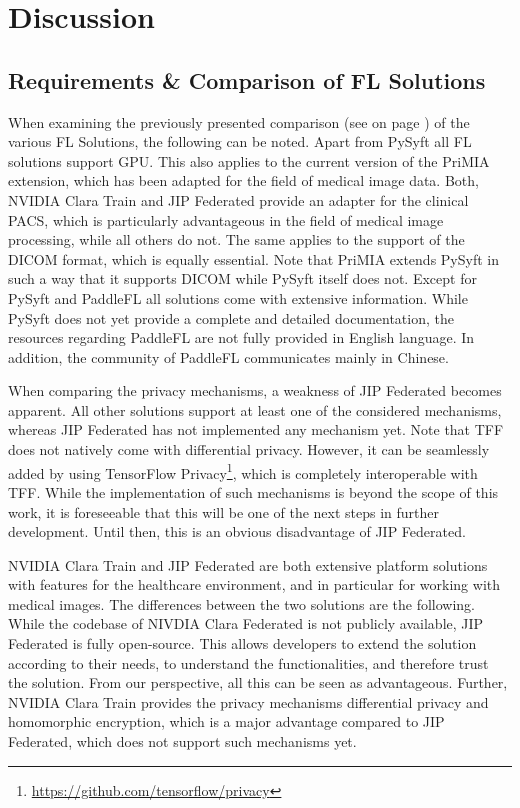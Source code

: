 \section{Discussion}
\label{sec:Discussion}

\subsection{Requirements \& Comparison of FL Solutions}
\label{subsec:DiscussionRequirements}

When examining the previously presented comparison (see  on page \pageref{subsec:ResultsRequirements}) of the various FL Solutions, the following can be noted.
Apart from PySyft all FL solutions support GPU. This also applies to the current version of the PriMIA extension, which has been adapted for the field of medical image data.
Both, NVIDIA Clara Train and JIP Federated provide an adapter for the clinical PACS, which is particularly advantageous in the field of medical image processing, while all others do not. The same applies to the support of the DICOM format, which is equally essential.
Note that PriMIA extends PySyft in such a way that it supports DICOM while PySyft itself does not.
Except for PySyft and PaddleFL all solutions come with extensive information. While PySyft does not yet provide a complete and detailed documentation, the resources regarding PaddleFL are not fully provided in English language. In addition, the community of PaddleFL communicates mainly in Chinese.

When comparing the privacy mechanisms, a weakness of JIP Federated becomes apparent. All other solutions support at least one of the considered mechanisms, whereas JIP Federated has not implemented any mechanism yet.
Note that TFF does not natively come with differential privacy. However, it can be seamlessly added by using TensorFlow Privacy\footnote{\url{https://github.com/tensorflow/privacy}}, which is completely interoperable with TFF.
While the implementation of such mechanisms is beyond the scope of this work, it is foreseeable that this will be one of the next steps in further development. %
Until then, this is an obvious disadvantage of JIP Federated.

NVIDIA Clara Train and JIP Federated are both extensive platform solutions with features for the healthcare environment, and in particular for working with medical images.
The differences between the two solutions are the following. While the codebase of NIVDIA Clara Federated is not publicly available, JIP Federated is fully open-source. This allows developers to extend the solution according to their needs, to understand the functionalities, and therefore trust the solution.
From our perspective, all this can be seen as advantageous.
Further, NVIDIA Clara Train provides the privacy mechanisms differential privacy and homomorphic encryption, which is a major advantage compared to JIP Federated, which does not support such mechanisms yet.

